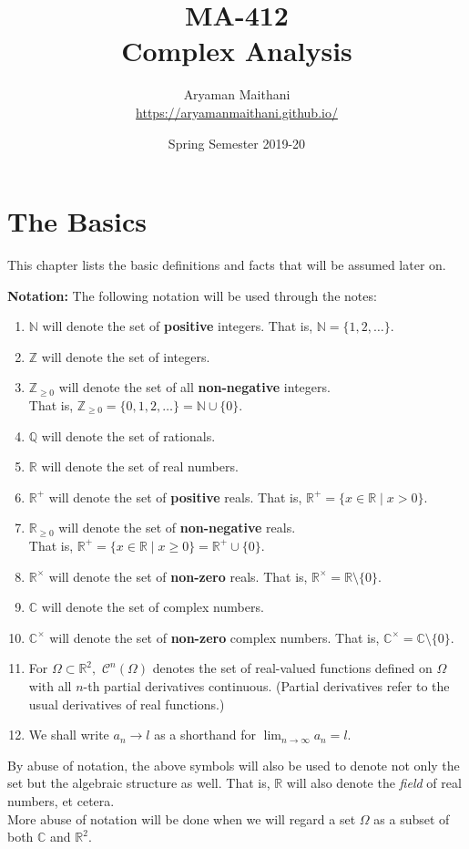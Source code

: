 \documentclass[12pt,oneside]{book}
\title{MA-412\\ Complex Analysis}
\author{Aryaman Maithani\\\url{https://aryamanmaithani.github.io/}}
\date{Spring Semester 2019-20}
\theoremstyle{definition}
\numberwithin{thm}{chapter}
\begin{document}
\maketitle

\chapter{The Basics}
This chapter lists the basic definitions and facts that will be assumed later on.

\textbf{Notation:} The following notation will be used through the notes:
\begin{enumerate}
	\item $\mathbb{N}$ will denote the set of \textbf{positive} integers. That is, $\mathbb{N} = \{1, 2, \ldots\}.$
	\item $\mathbb{Z}$ will denote the set of integers.
	\item $\mathbb{Z}_{\ge 0}$ will denote the set of all \textbf{non-negative} integers. \\
	That is, $\mathbb{Z}_{\ge 0} = \{0, 1, 2, \ldots\} = \mathbb{N} \cup \{0\}.$
	\item $\mathbb{Q}$ will denote the set of rationals.
	\item $\mathbb{R}$ will denote the set of real numbers.
	\item $\mathbb{R}^+$ will denote the set of \textbf{positive} reals. That is, $\mathbb{R}^+ = \{x \in \mathbb{R} \mid x > 0\}.$
	\item $\mathbb{R}_{\ge0}$ will denote the set of \textbf{non-negative} reals. \\
	That is, $\mathbb{R}^+ = \{x \in \mathbb{R} \mid x \ge 0\} = \mathbb{R}^+\cup \{0\}.$
	\item $\mathbb{R}^\times$ will denote the set of \textbf{non-zero} reals. That is, $\mathbb{R}^\times = \mathbb{R}\setminus\{0\}.$
	\item $\mathbb{C}$ will denote the set of complex numbers.
	\item $\mathbb{C}^\times$ will denote the set of \textbf{non-zero} complex numbers. That is, $\mathbb{C}^\times = \mathbb{C}\setminus\{0\}.$
	\item For $\Omega \subset \mathbb{R}^2,$ $\mathcal{C}^n(\Omega)$ denotes the set of real-valued functions defined on $\Omega$ with all $n$-th partial derivatives continuous. (Partial derivatives refer to the usual derivatives of real functions.)
	\item We shall write $a_n \to l$ as a shorthand for $\displaystyle\lim_{n\to \infty}a_n = l.$
\end{enumerate}
By abuse of notation, the above symbols will also be used to denote not only the set but the algebraic structure as well. That is, $\mathbb{R}$ will also denote the \emph{field} of real numbers, et cetera.\\
More abuse of notation will be done when we will regard a set $\Omega$ as a subset of both $\mathbb{C}$ and $\mathbb{R}^2.$
\end{document}
